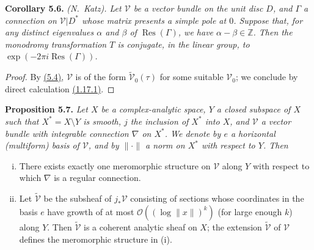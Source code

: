 \documentclass{report}
\newenvironment{itenv}[1]
  {\phantomsection\par\medskip\noindent\textbf{#1.}\itshape}
  {\par\medskip}
\renewcommand{\cal}[1]{{\mathcal{#1}}}
\newcommand{\ZZ}{\mathbb{Z}}
\newcommand{\order}{\mathcal{O}}
\DeclareMathOperator{\Res}{Res}
\begin{document}
\begin{itenv}{Corollary 5.6}
\label{II.5.6}
  \emph{(N.~Katz).}
  Let $\cal{V}$ be a vector bundle on the unit disc $D$, and $\Gamma$ a connection on $\cal{V}|D^*$ whose matrix presents a simple pole at $0$.
  Suppose that, for any distinct eigenvalues $\alpha$ and $\beta$ of $\Res(\Gamma)$, we have $\alpha-\beta\in\ZZ$.
  Then the monodromy transformation $T$ is conjugate, in the linear group, to $\exp(-2\pi i\Res(\Gamma))$.
\end{itenv}

\begin{proof}
  By \hyperref[II.5.4]{(5.4)}, $\cal{V}$ is of the form $\widetilde{\cal{V}}_0(\tau)$ for some suitable $\cal{V}_0$;
  we conclude by direct calculation \hyperref[II.1.17.1]{(1.17.1)}.
\end{proof}

\begin{itenv}{Proposition 5.7}
\label{II.5.7}
  Let $X$ be a complex-analytic space, $Y$ a closed subspace of $X$ such that $X^*=X\setminus Y$ is smooth, $j$ the inclusion of $X^*$ into $X$, and $\cal{V}$ a vector bundle with integrable connection $\nabla$ on $X^*$.
  We denote by $e$ a horizontal (multiform) basis of $\cal{V}$, and by $\|\cdot\|$ a norm on $X^*$ with respect to $Y$.
  Then
  \begin{enumerate}[(i)]
    \item There exists exactly one meromorphic structure on $\cal{V}$ along $Y$ with respect to which $\nabla$ is a regular connection.
    \item Let $\widetilde{\cal{V}}$ be the subsheaf of $j_*\cal{V}$ consisting of sections whose coordinates in the basis $e$ have growth of at most $\order((\log\|x\|)^k)$ (for large enough $k$) along $Y$.
      Then $\widetilde{\cal{V}}$ is a coherent analytic sheaf on $X$;
      the extension $\widetilde{\cal{V}}$ of $\cal{V}$ defines the meromorphic structure in (i).
  \end{enumerate}
\end{itenv}
\end{document}
